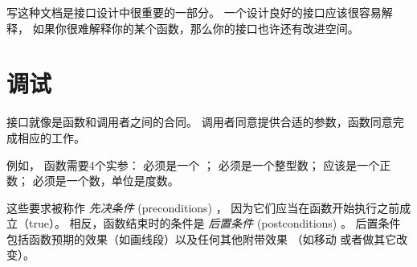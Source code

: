 
写这种文档是接口设计中很重要的一部分。 一个设计良好的接口应该很容易解释，
如果你很难解释你的某个函数，那么你的接口也许还有改进空间。


\section{调试}
  


接口就像是函数和调用者之间的合同。
调用者同意提供合适的参数，函数同意完成相应的工作。


例如，  函数需要4个实参：  必须是一个  ；
 必须是一个整型数；  应该是一个正数；
 必须是一个数，单位是度数。


这些要求被称作 \emph{先决条件} (preconditions) ，
因为它们应当在函数开始执行之前成立（true）。
相反，函数结束时的条件是 \emph{后置条件} (postconditions) 。
后置条件包括函数预期的效果（如画线段）以及任何其他附带效果
（如移动  或者做其它改变）。
  


